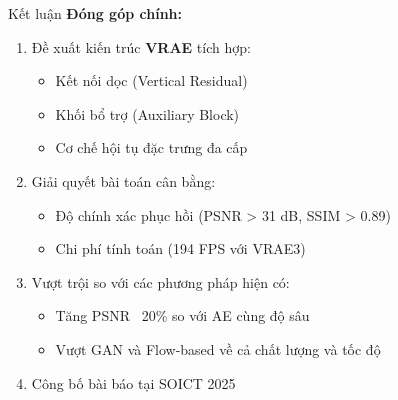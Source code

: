 
\begin{frame}{Kết luận}
    \textbf{Đóng góp chính:}
    \begin{enumerate}
        \item Đề xuất kiến trúc \textbf{VRAE} tích hợp:
        \begin{itemize}
            \item Kết nối dọc (Vertical Residual)
            \item Khối bổ trợ (Auxiliary Block)
            \item Cơ chế hội tụ đặc trưng đa cấp
        \end{itemize}
        \item Giải quyết bài toán cân bằng:
        \begin{itemize}
            \item Độ chính xác phục hồi (PSNR > 31 dB, SSIM > 0.89)
            \item Chi phí tính toán (194 FPS với VRAE3)
        \end{itemize}
        \item Vượt trội so với các phương pháp hiện có:
        \begin{itemize}
            \item Tăng PSNR ~20\% so với AE cùng độ sâu
            \item Vượt GAN và Flow-based về cả chất lượng và tốc độ
        \end{itemize}
        \item Công bố bài báo tại SOICT 2025
    \end{enumerate}
\end{frame}



        
        
        
    


